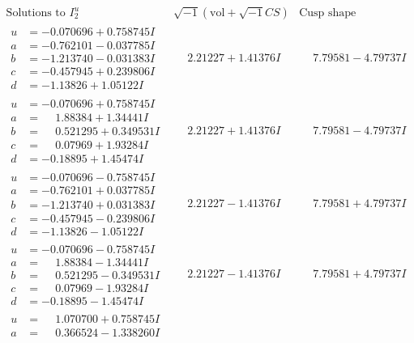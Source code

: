 \documentclass[1p]{elsarticle_modified}
\theoremstyle{definition}
\newcommand{\I}{\sqrt{-1}}
\begin{document}
$$\begin{array}{c|c|c}  
\text{Solutions to }I^u_{2}& \I (\text{vol} + \sqrt{-1}CS) & \text{Cusp shape}\\
 \hline 
\begin{aligned}
u &= -0.070696 + 0.758745 I \\
a &= -0.762101 - 0.037785 I \\
b &= -1.213740 - 0.031383 I \\
c &= -0.457945 + 0.239806 I \\
d &= -1.13826 + 1.05122 I\end{aligned}
 & \phantom{-}2.21227 + 1.41376 I & \phantom{-}7.79581 - 4.79737 I \\ \hline\begin{aligned}
u &= -0.070696 + 0.758745 I \\
a &= \phantom{-}1.88384 + 1.34441 I \\
b &= \phantom{-}0.521295 + 0.349531 I \\
c &= \phantom{-}0.07969 + 1.93284 I \\
d &= -0.18895 + 1.45474 I\end{aligned}
 & \phantom{-}2.21227 + 1.41376 I & \phantom{-}7.79581 - 4.79737 I \\ \hline\begin{aligned}
u &= -0.070696 - 0.758745 I \\
a &= -0.762101 + 0.037785 I \\
b &= -1.213740 + 0.031383 I \\
c &= -0.457945 - 0.239806 I \\
d &= -1.13826 - 1.05122 I\end{aligned}
 & \phantom{-}2.21227 - 1.41376 I & \phantom{-}7.79581 + 4.79737 I \\ \hline\begin{aligned}
u &= -0.070696 - 0.758745 I \\
a &= \phantom{-}1.88384 - 1.34441 I \\
b &= \phantom{-}0.521295 - 0.349531 I \\
c &= \phantom{-}0.07969 - 1.93284 I \\
d &= -0.18895 - 1.45474 I\end{aligned}
 & \phantom{-}2.21227 - 1.41376 I & \phantom{-}7.79581 + 4.79737 I \\ \hline\begin{aligned}
u &= \phantom{-}1.070700 + 0.758745 I \\
a &= \phantom{-}0.366524 - 1.338260 I \\

\end{aligned}
\end{array}$$
\end{document}
